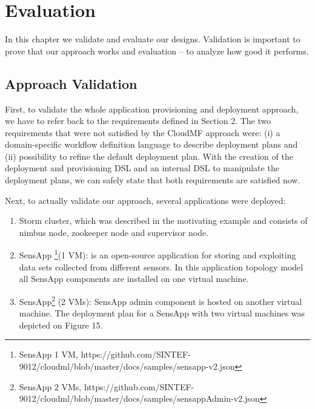 
\chapter{Evaluation} %

\label{Chapter4} %


\noindent In this chapter we validate and evaluate our designs. Validation is important to prove that our approach works and evaluation -- to analyze how good it performs.

\section{Approach Validation}

\noindent First, to validate the whole application provisioning and deployment approach, we have to refer back to the requirements defined in Section 2. The two requirements that were not satisfied by the CloudMF approach were: (i) a domain-specific workflow definition language to describe deployment plans and (ii) possibility to refine the default deployment plan. With the creation of the deployment and provisioning DSL and an internal DSL to manipulate the deployment plans, we can safely state that both requirements are satisfied now. 

\noindent Next, to actually validate our approach, several applications were deployed:

\begin{enumerate}
\item  Storm cluster, which was described in the motivating example and consists of nimbus node, zookeeper node and supervisor node.

\item  SensApp \footnote{ SensApp 1 VM, https://github.com/SINTEF-9012/cloudml/blob/master/docs/samples/sensapp-v2.json}(1 VM): is an open-source application for storing and exploiting data sets collected from different sensors. In this application topology model all SensApp components are installed on one virtual machine.

\item  SensApp\footnote{ SensApp 2 VMs, https://github.com/SINTEF-9012/cloudml/blob/master/docs/samples/sensappAdmin-v2.json} (2 VMs): SensApp admin component is hosted on another virtual machine. The deployment plan for a SensApp with two virtual machines was depicted on Figure 15. 
\end{enumerate}

